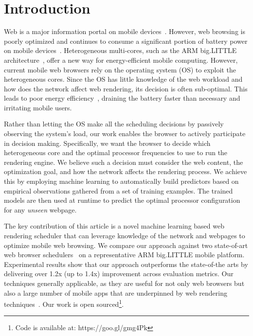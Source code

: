 \section{Introduction}
\vspace{-1mm}

Web is a major information portal on mobile devices~\cite{mobilestat}. However, web browsing is poorly optimized and continues to consume a
significant portion of battery power on mobile devices~\cite{thiagarajan2012killed,d2016energy,cao2017deconstructing}. Heterogeneous
multi-cores, such as the ARM big.LITTLE architecture~\cite{arm},  offer a new way for energy-efficient mobile computing. However, current
mobile web browsers rely on the operating system (OS) to exploit the heterogeneous cores. Since the OS has little knowledge of the web
workload and how does the network affect web rendering, its decision is often sub-optimal. This leads to poor energy
efficiency~\cite{zhu2015event}, draining the battery faster than necessary and irritating mobile users.

Rather than letting the OS make all the scheduling decisions by passively observing the system's load, our work enables the browser to
actively participate in decision making. Specifically, we want the browser to decide which heterogeneous core and the optimal processor
frequencies to use to run the rendering engine. We believe such a decision must consider the web content, the optimization goal, and how
the network affects the rendering process. We achieve this by employing machine learning to automatically build predictors based on
empirical observations gathered from a set of training examples. The trained models are then used at runtime to predict the optimal
processor configuration for any \emph{unseen} webpage.


The key contribution of this article is a novel machine learning based web rendering scheduler that can leverage knowledge of the network
and webpages to optimize mobile web browsing. We compare our approach against two state-of-art web browser
schedulers~\cite{YZhu13,ren2016optimise} on a representative ARM big.LITTLE mobile platform. Experimental results show that our approach
outperforms the state-of-the arts by delivering over 1.2x (up to 1.4x) improvement across evaluation metrics. Our techniques generally
applicable, as they are useful for not only web browsers but also a large number of mobile apps that are underpinned by web rendering
techniques~\cite{Charland}. Our work is open sourced\footnote{Code is available at: https://goo.gl/gmg4Pk}.
